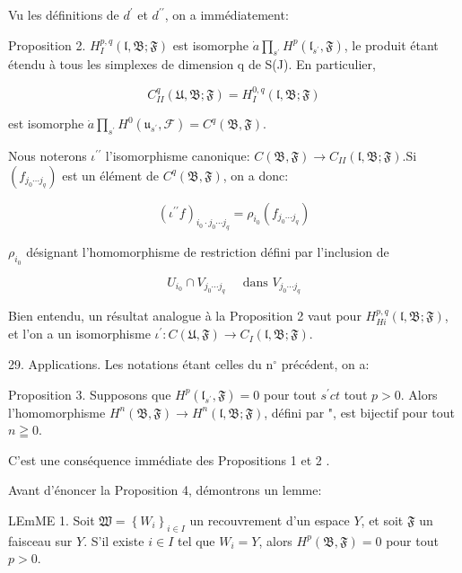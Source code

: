 Vu les définitions de $d^{\prime}$ et $d^{\prime \prime}$, on a immédiatement:

Proposition 2. $H_{I}^{p, q}(\mathfrak{l}, \mathfrak{B} ; \mathfrak{F})$ est isomorphe $\dot{a} \prod_{s^{\prime}} H^{p}\left(\mathfrak{l}_{s^{\prime}}, \mathfrak{F}\right)$, le produit étant étendu à tous les simplexes de dimension q de S(J). En particulier,

$$
C_{I I}^{q}(\mathfrak{U}, \mathfrak{B} ; \mathfrak{F})=H_{I}^{0, q}(\mathfrak{l}, \mathfrak{B} ; \mathfrak{F})
$$

est isomorphe $\dot{a} \prod_{s^{\prime}} H^{0}\left(\mathfrak{u}_{s^{\prime}}, \mathcal{F}\right)=C^{q}(\mathfrak{B}, \mathfrak{F}) .$

Nous noterons $\iota^{\prime \prime}$ l'isomorphisme canonique: $C(\mathfrak{B}, \mathfrak{F}) \rightarrow C_{I I}(\mathfrak{l}, \mathfrak{B} ; \mathfrak{F}) . \mathrm{Si}$ $\left(f_{j_{0} \cdots j_{q}}\right)$ est un élément de $C^{q}(\mathfrak{B}, \mathfrak{F})$, on a donc:

$$
\left(\iota^{\prime \prime} f\right)_{i_{0} \cdot j_{0} \cdots j_{q}}=\rho_{i_{0}}\left(f_{j_{0} \cdots j_{q}}\right)
$$

$\rho_{i_{0}}$ désignant l'homomorphisme de restriction défini par l'inclusion de

$$
U_{i_{0}} \cap V_{j_{0} \cdots j_{q}} \quad \text { dans } V_{j_{0} \cdots j_{q}}
$$

Bien entendu, un résultat analogue à la Proposition 2 vaut pour $H_{H i}^{p, q}(\mathfrak{l}, \mathfrak{B} ; \mathfrak{F})$, et l'on a un isomorphisme $\iota^{\prime}: C(\mathfrak{U}, \mathfrak{F}) \rightarrow C_{I}(\mathfrak{l}, \mathfrak{B} ; \mathfrak{F})$.

29. Applications. Les notations étant celles du $\mathrm{n}^{\circ}$ précédent, on a:

Proposition 3. Supposons que $H^{p}\left(\mathfrak{l}_{s^{\prime}}, \mathfrak{F}\right)=0$ pour tout $s^{\prime} c t$ tout $p>0$. Alors l'homomorphisme $H^{n}(\mathfrak{B}, \mathfrak{F}) \rightarrow H^{n}(\mathfrak{l}, \mathfrak{B} ; \mathfrak{F})$, défini par \iota", est bijectif pour tout $n \geqq 0$.

C'est une conséquence immédiate des Propositions 1 et 2 .

Avant d'énoncer la Proposition 4, démontrons un lemme:

LEmME 1. Soit $\mathfrak{W}=\left\{W_{i}\right\}_{i \in I}$ un recouvrement d'un espace $Y$, et soit $\mathfrak{F}$ un faisceau sur $Y$. S'il existe $i \in I$ tel que $W_{i}=Y$, alors $H^{p}(\mathfrak{B}, \mathfrak{F})=0$ pour tout $p>0$.

